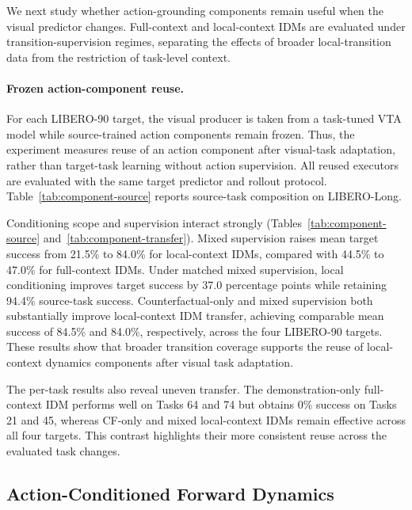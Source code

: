 

We next study whether action-grounding components remain useful when the visual predictor changes. Full-context and local-context IDMs are evaluated under transition-supervision regimes, separating the effects of broader local-transition data from the restriction of task-level context.

\paragraph{Frozen action-component reuse.}
For each LIBERO-90 target, the visual producer is taken from a task-tuned
VTA model while source-trained action components remain frozen. Thus, the
experiment measures reuse of an action component after visual-task
adaptation, rather than target-task learning without action supervision.
All reused executors are evaluated with the same target predictor and
rollout protocol. Table~\ref{tab:component-source} reports source-task
composition on LIBERO-Long.

Conditioning scope and supervision interact strongly
(Tables~\ref{tab:component-source} and~\ref{tab:component-transfer}).
Mixed supervision raises mean target success from 21.5\% to 84.0\%
for local-context IDMs, compared with 44.5\% to 47.0\% for
full-context IDMs. Under matched mixed supervision, local conditioning
improves target success by 37.0 percentage points while retaining
94.4\% source-task success.
Counterfactual-only and mixed supervision both substantially improve
local-context IDM transfer, achieving comparable mean success of 84.5\%
and 84.0\%, respectively, across the four LIBERO-90 targets. These
results show that broader transition coverage supports the reuse of
local-context dynamics components after visual task adaptation.

The per-task results also reveal uneven transfer. The demonstration-only
full-context IDM performs well on Tasks 64 and 74 but obtains 0\%
success on Tasks 21 and 45, whereas CF-only and mixed local-context
IDMs remain effective across all four targets. This contrast highlights
their more consistent reuse across the evaluated task changes.


\subsection{Action-Conditioned Forward Dynamics}

